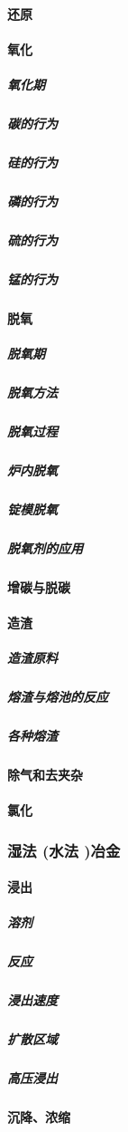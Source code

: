 \documentclass[UTF8]{../../ApplicationUniverse}
\begin{document}
            \paragraph{还原}
            \paragraph{氧化}
                \subparagraph{氧化期}
                \subparagraph{碳的行为}
                \subparagraph{硅的行为}
                \subparagraph{磷的行为}
                \subparagraph{硫的行为}
                \subparagraph{锰的行为}
            \paragraph{脱氧}
                \subparagraph{脱氧期}
                \subparagraph{脱氧方法}
                \subparagraph{脱氧过程}
                \subparagraph{炉内脱氧}
                \subparagraph{锭模脱氧}
                \subparagraph{脱氧剂的应用}
            \paragraph{增碳与脱碳}
            \paragraph{造渣}
                \subparagraph{造渣原料}
                \subparagraph{熔渣与熔池的反应}
                \subparagraph{各种熔渣}
            \paragraph{除气和去夹杂}
            \paragraph{氯化}
        \subsubsection{湿法 (水法 )冶金}
            \paragraph{浸出}
                \subparagraph{溶剂}
                \subparagraph{反应}
                \subparagraph{浸出速度}
                \subparagraph{扩散区域}
                \subparagraph{高压浸出}
            \paragraph{沉降、浓缩}
\end{document}
